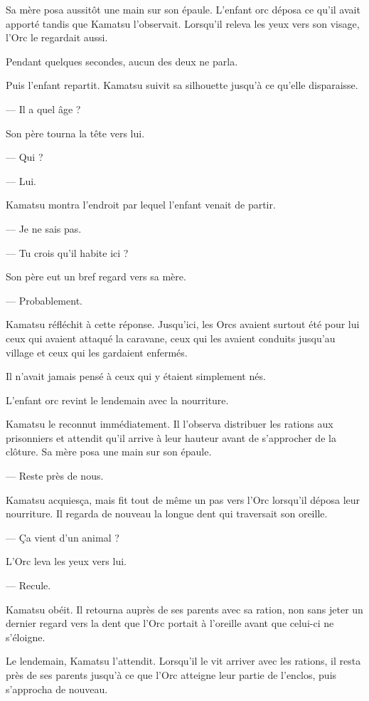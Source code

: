 Sa mère posa aussitôt une main sur son épaule. L'enfant orc déposa ce qu'il
avait apporté tandis que Kamatsu l'observait. Lorsqu'il releva les yeux vers
son visage, l'Orc le regardait aussi.

Pendant quelques secondes, aucun des deux ne parla.

Puis l'enfant repartit. Kamatsu suivit sa silhouette jusqu'à ce qu'elle
disparaisse.

— Il a quel âge ?

Son père tourna la tête vers lui.

— Qui ?

— Lui.

Kamatsu montra l'endroit par lequel l'enfant venait de partir.

— Je ne sais pas.

— Tu crois qu'il habite ici ?

Son père eut un bref regard vers sa mère.

— Probablement.

Kamatsu réfléchit à cette réponse. Jusqu'ici, les Orcs avaient surtout été
pour lui ceux qui avaient attaqué la caravane, ceux qui les avaient conduits
jusqu'au village et ceux qui les gardaient enfermés.

Il n'avait jamais pensé à ceux qui y étaient simplement nés.

\scenebreak

L'enfant orc revint le lendemain avec la nourriture.

Kamatsu le reconnut immédiatement. Il l'observa distribuer les rations aux
prisonniers et attendit qu'il arrive à leur hauteur avant de s'approcher de la
clôture. Sa mère posa une main sur son épaule.

— Reste près de nous.

Kamatsu acquiesça, mais fit tout de même un pas vers l'Orc lorsqu'il déposa
leur nourriture. Il regarda de nouveau la longue dent qui traversait son
oreille.

— Ça vient d'un animal ?

L'Orc leva les yeux vers lui.

— Recule.

Kamatsu obéit. Il retourna auprès de ses parents avec sa ration, non sans jeter
un dernier regard vers la dent que l'Orc portait à l'oreille avant que celui-ci
ne s'éloigne.

Le lendemain, Kamatsu l'attendit. Lorsqu'il le vit arriver avec les rations, il
resta près de ses parents jusqu'à ce que l'Orc atteigne leur partie de
l'enclos, puis s'approcha de nouveau.

